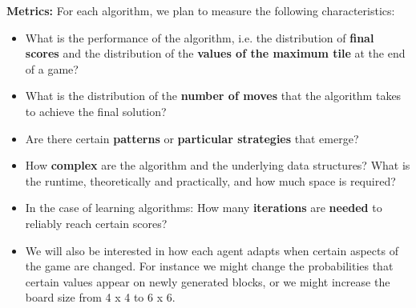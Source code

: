 \documentclass[12pt]{article}
\begin{document}
\pagebreak
\noindent \textbf{Metrics: } For each algorithm, we plan to measure the following characteristics:
\begin{itemize}
\itemsep-0.2em
	\item What is the performance of the algorithm, i.e. the distribution of \textbf{final scores} and the distribution of the \textbf{values of the maximum tile} at the end of a game?
	\item What is the distribution of the \textbf{number of moves} that the algorithm takes to achieve the final solution?
	\item Are there certain \textbf{patterns} or \textbf{particular strategies} that emerge? 
	\item How \textbf{complex} are the algorithm and the underlying data structures? What is the runtime, theoretically and practically, and how much space is required?
	\item In the case of learning algorithms: How many \textbf{iterations} are \textbf{needed} to reliably reach certain scores?
	\item We will also be interested in how each agent adapts when certain aspects of the game are changed.  For instance we might change the probabilities that certain values appear on newly generated blocks, or we might increase the board size from 4 x 4 to 6 x 6.
\end{itemize}
\end{document}
